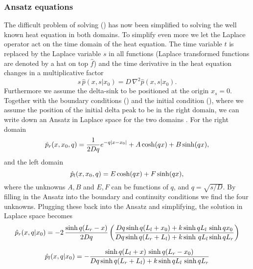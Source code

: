 \subsubsection{Ansatz equations}

The difficult problem of solving () has now been simplified to solving the well known heat equation in both domains. To simplify even more we let the Laplace operator act on the time domain of the heat equation. The time variable $t$ is replaced by the Laplace variable $s$ in all functions (Laplace transformed functions are denoted by a hat on top $\hat{f}$) and the time derivative in the heat equation changes in a multiplicative factor
\begin{equation}
 s \, \hat{p}(x,s|x_0) = D \, \nabla^2 \hat{p}(x,s|x_0).
\end{equation}
Furthermore we assume the delta-sink to be positioned at the origin $x_s=0$. Together with the boundary conditions () and the initial condition (), where we assume the position of the initial delta peak to be in the right domain, we can write down an Ansatz in Laplace space for the two domains \cite{Carslaw1959}. For the right domain
\begin{equation}
 \hat{p}_r(x,x_0,q) = \frac{1}{2 D q} e^{-q |x-x_0|} + A \, \mathrm{cosh} (q x) + B \, \mathrm{sinh} (q x),
 \elabel{Anz_R}
\end{equation}
and the left domain
\begin{equation}
 \hat{p}_l(x,x_0,q) = E \, \mathrm{cosh} (q x) + F \, \mathrm{sinh} (q x),
\elabel{Anz_L}
\end{equation}
where the unknowns $A,B$ and $E,F$ can be functions of $q$, and $q=\sqrt{s/D}$. By filling in the Ansatz into the boundary and continuity conditions we find the four unknowns. Plugging these back into the Ansatz and simplifying, the solution in Laplace space becomes
\begin{equation}
 \hat{p}_r(x,q|x_0) = -2 \, \frac{\mathrm{sinh} \, q(L_r - x)}{2 D q} \left( \frac{Dq \, \mathrm{sinh} \, q(L_l + x_0) + k \, \mathrm{sinh} \, q L_l \,\, \mathrm{sinh} \, q x_0}{Dq \, \mathrm{sinh} \, q(L_r + L_l) + k \, \mathrm{sinh} \,\, q L_l \, \mathrm{sinh} \, q L_r} \right)
 \elabel{SOL_R}
\end{equation}

\begin{equation}
 \hat{p}_l(x,q|x_0) = -\frac{\mathrm{sinh} \, q(L_l + x) \,\, \mathrm{sinh} \, q(L_r - x_0)}{Dq \, \mathrm{sinh} \, q(L_r + L_l) + k \, \mathrm{sinh} \, q L_l \,\, \mathrm{sinh} \, q L_r}
\elabel{SOL_L}
\end{equation}

